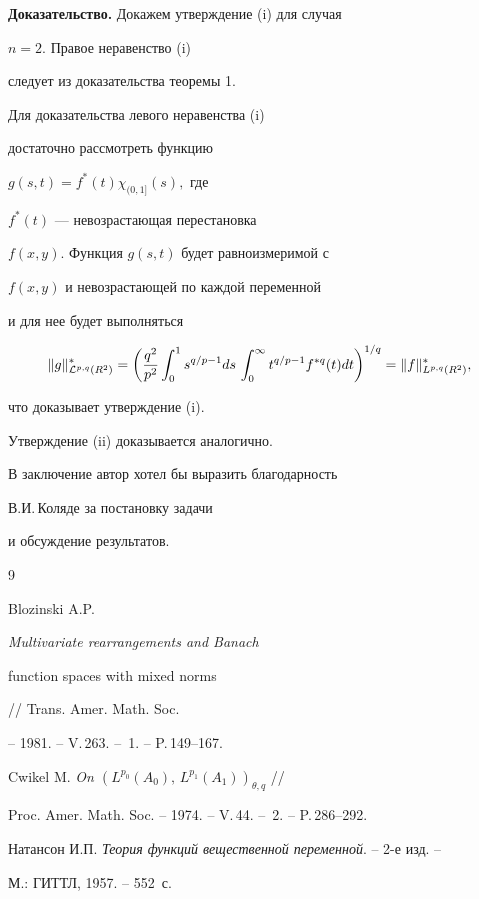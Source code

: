 {\bf Доказательство.} Докажем утверждение (i) для случая


$n=2.$ Правое неравенство (i)


следует из доказательства теоремы 1.


Для доказательства левого неравенства (i)


достаточно рассмотреть функцию


$g(s,t) = f^*(t) \chi_{(0,1]}(s),$ где


$f^{\ast}(t)$ --- невозрастающая перестановка


$f(x,y).$ Функция $g(s,t)$ будет равноизмеримой с


$f(x,y)$ и невозрастающей по каждой переменной


и для нее будет выполняться


$$


\|g\|_{{\cal L}^{p,q}(R^2)}^* =


\biggl(\frac{q^2}{p^2} \int_0^1


s^{q/p-1} ds \,


\int_0^{\infty} t^{q/p-1} f^{*q}(t) dt


\biggr)^{1/q} = \|f\|_{L^{p,q}(R^2)}^*,


$$


что доказывает утверждение (i).





Утверждение (ii) доказывается аналогично.





В заключение автор хотел бы выразить благодарность


В.И.\,Коляде за постановку задачи


и обсуждение результатов. 





\begin{thebibliography}{9}







Blozinski A.P. {\em Multivariate rearrangements and Banach


function spaces with mixed norms} // Trans. Amer. Math. Soc.


-- 1981. -- V.\,263. -- \No\,1. -- P.\,149--167.




Cwikel M. {\em On $(L^{p_0}(A_0),\,L^{p_1}(A_1))_{\theta,q}$} //


Proc. Amer. Math. Soc. -- 1974. -- V.\,44. -- \No\,2. -- P.\,286--292.




Натансон И.П. {\em Теория функций вещественной переменной}. -- 2-е изд. --


М.: ГИТТЛ, 1957. -- 552~с.





\end{thebibliography}





